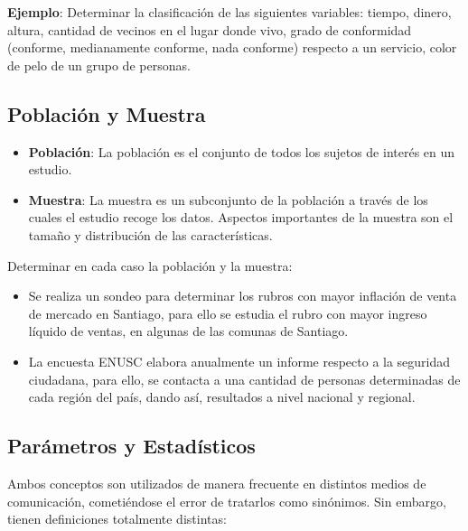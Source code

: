 \documentclass[
]{book}
\providecommand{\tightlist}{%
  \setlength{\itemsep}{0pt}\setlength{\parskip}{0pt}}
\theoremstyle{definition}
\theoremstyle{definition}
\theoremstyle{definition}
\theoremstyle{definition}
\theoremstyle{remark}
\begin{document}
\textbf{Ejemplo}: Determinar la clasificación de las siguientes variables: tiempo, dinero, altura, cantidad de vecinos en el lugar donde vivo, grado de conformidad (conforme, medianamente conforme, nada conforme) respecto a un servicio, color de pelo de un grupo de personas.

\hypertarget{poblaciuxf3n-y-muestra}{%
\subsection*{Población y Muestra}\label{poblaciuxf3n-y-muestra}}

\begin{itemize}
\tightlist
\item
  \textbf{Población}: La población es el conjunto de todos los sujetos de interés en un estudio.
\item
  \textbf{Muestra}: La muestra es un subconjunto de la población a través de los cuales el estudio recoge los datos. Aspectos importantes de la muestra son el tamaño y distribución de las características.
\end{itemize}

Determinar en cada caso la población y la muestra:

\begin{itemize}
\tightlist
\item
  Se realiza un sondeo para determinar los rubros con mayor inflación de venta de mercado en Santiago, para ello se estudia el rubro con mayor ingreso líquido de ventas, en algunas de las comunas de Santiago.
\item
  La encuesta ENUSC elabora anualmente un informe respecto a la seguridad ciudadana, para ello, se contacta a una cantidad de personas determinadas de cada región del país, dando así, resultados a nivel nacional y regional.
\end{itemize}

\hypertarget{paruxe1metros-y-estaduxedsticos}{%
\subsection*{Parámetros y Estadísticos}\label{paruxe1metros-y-estaduxedsticos}}

Ambos conceptos son utilizados de manera frecuente en distintos medios de comunicación, cometiéndose el error de tratarlos como sinónimos. Sin embargo, tienen definiciones totalmente distintas:
\end{document}
